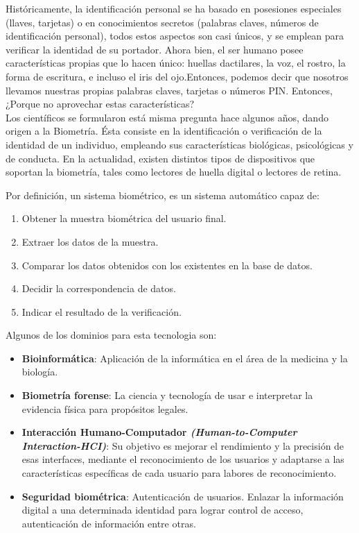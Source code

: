 Históricamente, la identificación personal se ha basado en posesiones especiales (llaves, tarjetas) o en conocimientos secretos (palabras claves, números de identificación personal), todos estos aspectos son casi únicos, y se emplean para verificar la identidad de su portador. Ahora bien, el ser humano posee características propias que lo hacen único: huellas dactilares, la voz, el rostro, la forma de escritura, e incluso el iris del ojo.Entonces, podemos decir que nosotros llevamos nuestras propias palabras claves, tarjetas o números PIN. Entonces, ¿Porque no aprovechar estas características?\\

Los científicos se formularon está misma pregunta hace algunos años, dando
origen a la Biometría. Ésta consiste en la identificación o verificación de la identidad de un individuo, empleando sus características biológicas, psicológicas y de conducta. En la actualidad, existen distintos tipos de dispositivos que soportan la biometría, tales como
lectores de huella digital o lectores de retina.\cite{Car08}\\
\newpage

Por definición, un sistema biométrico, es un sistema automático capaz de:\\

\begin{enumerate}

\item Obtener la muestra biométrica del usuario final.
\item Extraer los datos de la muestra.
\item Comparar los datos obtenidos con los existentes en la base de datos.
\item Decidir la correspondencia de datos.
\item Indicar el resultado de la verificación.
\end{enumerate}

Algunos de los dominios para esta tecnologia son:
\begin{itemize}
\item \textbf{Bioinformática}: Aplicación de la informática en el área de la medicina y la biología.
\item \textbf{Biometría forense}: La ciencia y tecnología de usar e interpretar la evidencia física para propósitos legales.
\item \textbf{Interacción Humano-Computador \textit{(Human-to-Computer Interaction-HCI)}}: Su objetivo es mejorar el rendimiento y la precisión de esas interfaces, mediante el reconocimiento de los usuarios y adaptarse a las características específicas de cada usuario para labores de reconocimiento.
\item \textbf{Seguridad biométrica}: Autenticación de usuarios. Enlazar la información digital a una determinada identidad para lograr control de acceso, autenticación de información entre otras.
\end{itemize}

